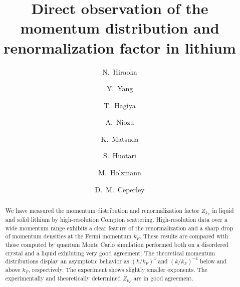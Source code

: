 \documentclass[twocolumn,showpacs,showkeys,fleqn,prl,superscriptaddress]{revtex4}%
\begin{document}

\title{
Direct observation of the momentum distribution and renormalization factor in lithium
}

\author{ 
N.~Hiraoka
}

\author{ 
Y.~Yang
}

\author{ 
T.~Hagiya
}
  
\author{ 
A.~Niozu
}

\author{ 
K.~Matsuda
}

\author{ 
S.~Huotari
}


\author{ 
M.~Holzmann
}

\author{ 
D.~M.~Ceperley
}


\date{}
\begin{abstract}

We have measured the momentum distribution and renormalization factor $Z_{k_F}$ in liquid and solid lithium by high-resolution Compton scattering.
High-resolution data over a wide momentum range exhibits a clear feature of the renormalization and a sharp drop of momentum densities at the Fermi momentum $k_F$.
These results are compared with those computed by quantum Monte Carlo simulation performed both on a disordered crystal and a liquid exhibiting very good agreement.
The theoretical momentum distributions display an asymptotic behavior as $(k/k_F)^4$ and $(k/k_F)^{-4}$ below and above $k_F$, respectively.
The experiment shows slightly smaller exponents.
The experimentally and theoretically determined $Z_{k_F}$ are in good agreement.
\end{abstract}
\maketitle
\end{document}
